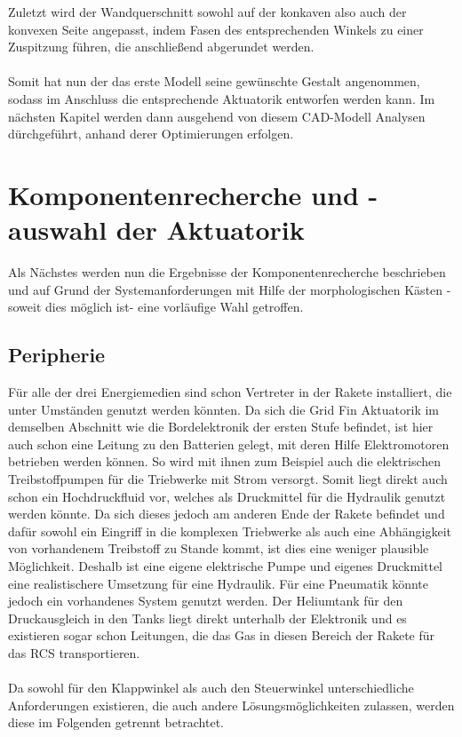 Zuletzt wird der Wandquerschnitt sowohl auf der konkaven also auch der konvexen Seite angepasst, indem Fasen des entsprechenden Winkels zu einer Zuspitzung führen, die anschließend abgerundet werden.
\\~\\
Somit hat nun der das erste Modell seine gewünschte Gestalt angenommen, sodass im Anschluss die entsprechende Aktuatorik entworfen werden kann. Im nächsten Kapitel werden dann ausgehend von diesem CAD-Modell Analysen dürchgeführt, anhand derer Optimierungen erfolgen.
\section{Komponentenrecherche und -auswahl der Aktuatorik}
Als Nächstes werden nun die Ergebnisse der Komponentenrecherche beschrieben und auf Grund der Systemanforderungen mit Hilfe der morphologischen Kästen -soweit dies möglich ist- eine vorläufige Wahl getroffen.
\subsection{Peripherie}
Für alle der drei Energiemedien sind schon Vertreter in der Rakete installiert, die unter Umständen genutzt werden könnten. Da sich die Grid Fin Aktuatorik im demselben Abschnitt wie die Bordelektronik der ersten Stufe befindet, ist hier auch schon eine Leitung zu den Batterien gelegt, mit deren Hilfe Elektromotoren betrieben werden können. So wird mit ihnen zum Beispiel auch die elektrischen Treibstoffpumpen für die Triebwerke mit Strom versorgt. Somit liegt direkt auch schon ein Hochdruckfluid vor, welches als Druckmittel für die Hydraulik genutzt werden könnte. Da sich dieses jedoch am anderen Ende der Rakete befindet und dafür sowohl ein Eingriff in die komplexen Triebwerke als auch eine Abhängigkeit von vorhandenem Treibstoff zu Stande kommt, ist dies eine weniger plausible Möglichkeit. Deshalb ist eine eigene elektrische Pumpe und eigenes Druckmittel eine realistischere Umsetzung für eine Hydraulik. Für eine Pneumatik könnte jedoch ein vorhandenes System genutzt werden. Der Heliumtank für den Druckausgleich in den Tanks liegt direkt unterhalb der Elektronik und es existieren sogar schon Leitungen, die das Gas in diesen Bereich der Rakete für das RCS transportieren.
\\~\\
Da sowohl für den Klappwinkel als auch den Steuerwinkel unterschiedliche Anforderungen existieren, die auch andere Lösungsmöglichkeiten zulassen, werden diese im Folgenden getrennt betrachtet.
